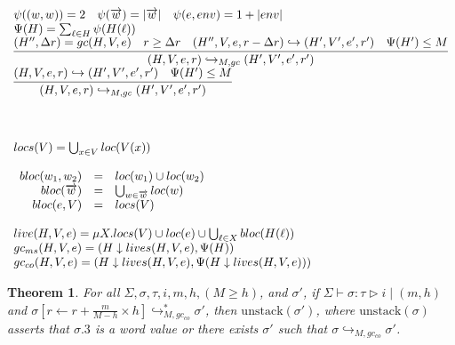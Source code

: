 \documentclass[fleqn]{article}
\newtheorem{theorem}{Theorem}
\begin{document}
\[\begin{array}{l}
	\psi((w,w)) = 2 \hspace{1em} \psi(\overrightarrow{w}) = |\overrightarrow{w}| \hspace{1em} \psi(e,env)=1+|env| \\
	\Psi(H) = \sum_{\ell \in H} \psi(H(\ell)) \\
	\infer{(H,V,e,r) \hookrightarrow_{M,gc} (H',V',e',r')}{(H'',\Delta r) = gc(H,V,e) & r \ge \Delta r & (H'',V,e,r-\Delta r) \hookrightarrow (H',V',e',r') & \Psi(H') \le M} \\
	\infer{(H,V,e,r) \hookrightarrow_{M,gc} (H',V',e',r')}{(H,V,e,r) \hookrightarrow (H',V',e',r') & \Psi(H') \le M} \\
	\\
	\\
	\\
	locs(V) = \bigcup_{x\in V} loc(V(x)) \\
	\\
	\begin{array}{rcl}
		bloc(w_1,w_2) & = & loc(w_1) \cup loc(w_2) \\
		bloc(\overrightarrow{w}) & = & \bigcup_{w \in \overrightarrow{w}} loc(w) \\
		bloc(e,V) & = & locs(V)
	\end{array} \\
	\\
	live(H,V,e) = \mu X. locs(V) \cup loc(e) \cup \bigcup_{\ell \in X} bloc(H(\ell))  \\
	gc_{ms}(H,V,e) = (H \downarrow lives(H,V,e), \Psi(H)) \\
	gc_{co}(H,V,e) = (H \downarrow lives(H,V,e), \Psi(H \downarrow lives(H,V,e)))
\end{array}
\]

\begin{theorem}
	For all $\Sigma,\sigma,\tau,i,m,h,(M \ge h)$, and $\sigma'$, if $\Sigma \vdash \sigma : \tau \triangleright i \mid (m,h)$ and $\sigma[r \leftarrow r+ \frac{m}{M-h}\times h] \hookrightarrow_{M,gc_{co}}^* \sigma'$,
	then $\mathrm{unstack}(\sigma')$, where $\mathrm{unstack}(\sigma)$ asserts that $\sigma.3$ is a word value or there exists $\sigma'$ such that $\sigma \hookrightarrow_{M,gc_{co}} \sigma'$.
\end{theorem}
\end{document}
